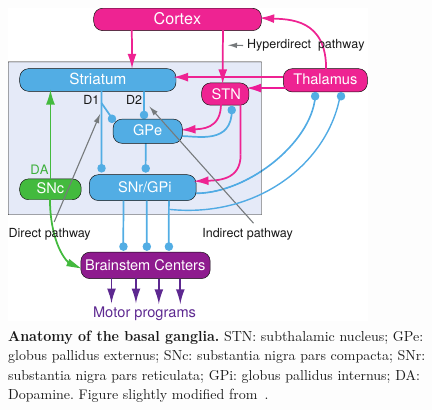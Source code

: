 \begin{figure}[bth]
  \begin{center}
    \includegraphics[width=0.9\linewidth]{ch-intro/figures/BGAnatomy}
    \caption[Anatomy of the Basal Ganglia]
    {\textbf{Anatomy of the basal ganglia.}
    STN: subthalamic nucleus;
    GPe: globus pallidus externus;
    SNc: substantia nigra pars compacta;
    SNr: substantia nigra pars reticulata;
    GPi: globus pallidus internus;
    DA: Dopamine.
    Figure slightly modified from~\cite{Grillner2016BG}.
    }
    \label{fig:intro:BGAnatomy}
  \end{center}
\end{figure}